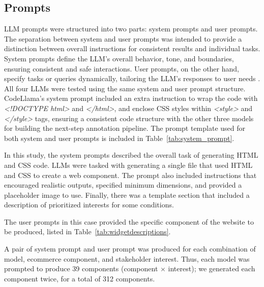 \subsection{Prompts}
LLM prompts were structured into two parts: system prompts and user prompts.  The separation between system and user prompts was intended to provide a distinction between overall instructions for consistent results and individual tasks. System prompts define the LLM's overall behavior, tone, and boundaries, ensuring consistent and safe interactions. User prompts, on the other hand, specify tasks or queries dynamically, tailoring the LLM's responses to user needs \cite{a:67}. All four LLMs were tested using the same system and user prompt structure. CodeLlama's system prompt included an extra instruction to wrap the code with \textit{<!DOCTYPE html>} and \textit{</html>}, and enclose CSS styles within \textit{<style>} and \textit{</style>} tags, ensuring a consistent code structure with the other three models for building the next-step annotation pipeline. The prompt template used for both system and user prompts is included in Table~\ref{tab:system_prompt}. 

In this study, the system prompts described the overall task of generating HTML and CSS code. LLMs were tasked with generating a single file that used HTML and CSS to create a web component. The prompt also included instructions that encouraged realistic outputs, specified minimum dimensions, and provided a placeholder image to use. Finally, there was a template section that included a description of prioritized interests for some conditions. 

The user prompts in this case provided the specific component of the website to be produced, listed in Table~\ref{tab:widgetdescriptions}. 

A pair of system prompt and user prompt was produced for each combination of model, ecommerce component, and stakeholder interest. Thus, each model was prompted to produce 39 components (component $\times$ interest); we generated each component twice, for a total of 312 components.




